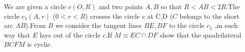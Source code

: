 We are given a circle $c(O,R)$ and two points $A,B$ so that $R<AB<2R$.The circle $c_1 (A,r)$ ($0<r<R$) crosses the circle $c$ at C,D ($C$ belongs to the short arc $AB$).From $B$ we consider the tangent lines $BE,BF$ to the circle $c_1$ ,in such way that $E$ lays out of the circle $c$.If $M\equiv EC\cap DF$ show that the quadrilateral $BCFM$ is cyclic.